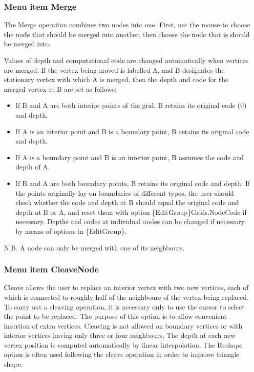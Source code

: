 \documentclass{article}
\begin{document}
\subsubsection[Menu item Merge]{Menu item Merge}

The Merge operation combines two nodes into one. First, use the mouse to choose the node that should be merged into another, then choose the node that is should be merged into. 

Values of depth and computational code are changed automatically when vertices are merged. If the vertex being moved is labelled A, and B designates the stationary vertex with which A is merged, then the depth and code for the merged vertex at B are set as follows:

\begin{itemize}
\item If B and A are both interior points of the grid, B retains its original code (0) and depth.
\item If A is an interior point and B is a boundary point, B retains its original code and depth.
\item If A is a boundary point and B is an interior point, B assumes the code and depth of A.
\item If B and A are both boundary points, B retains its original code and depth. If the points originally lay on boundaries of different types, the user should check whether the code and depth at B should equal the original code and depth at B or A, and reset them with option \{EditGroup\}Grids.NodeCode if necessary. Depths and codes at individual nodes can be changed if necessary by means of options in \{EditGroup\}.
\end{itemize}

N.B. A node can only be merged with one of its neighbours.

\subsubsection[Menu item CleaveNode]{Menu item CleaveNode}
Cleave allows the user to replace an interior vertex with two new vertices, each of which is connected to roughly half of the neighbours of the vertex being replaced. To carry out a cleaving operation, it is necessary only to use the cursor to select the point to be replaced. The purpose of this option is to allow convenient insertion of extra vertices. Cleaving is not allowed on boundary vertices or with interior vertices having only three or four neighbours. The depth at each new vertex position is computed automatically by linear interpolation. The Reshape option is often used following the cleave operation in order to improve triangle shape.
\end{document}
